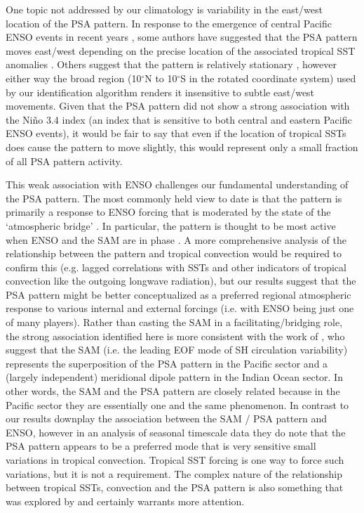 One topic not addressed by our climatology is variability in the east/west location of the PSA pattern. In response to the emergence of central Pacific ENSO events in recent years \citep[e.g.][]{Ashok2007}, some authors have suggested that the PSA pattern moves east/west depending on the precise location of the associated tropical SST anomalies \citep[e.g.][]{Sun2013,Wilson2014,Ciasto2015}. Others suggest that the pattern is relatively stationary \citep[e.g.][]{Liu2007,Ding2012}, however either way the broad region (10$^{\circ}$N to 10$^{\circ}$S in the rotated coordinate system) used by our identification algorithm renders it insensitive to subtle east/west movements. Given that the PSA pattern did not show a strong association with the Ni\~{n}o 3.4 index (an index that is sensitive to both central and eastern Pacific ENSO events), it would be fair to say that even if the location of tropical SSTs does cause the pattern to move slightly, this would represent only a small fraction of all PSA pattern activity. 

This weak association with ENSO challenges our fundamental understanding of the PSA pattern. The most commonly held view to date is that the pattern is primarily a response to ENSO forcing \citep[e.g.][]{Mo2001} that is moderated by the state of the `atmospheric bridge' \citep{Liu2007}. In particular, the pattern is thought to be most active when ENSO and the SAM are in phase \citep{Fogt2006}. A more comprehensive analysis of the relationship between the pattern and tropical convection would be required to confirm this (e.g. lagged correlations with SSTs and other indicators of tropical convection like the outgoing longwave radiation), but our results suggest that the PSA pattern might be better conceptualized as a preferred regional atmospheric response to various internal and external forcings (i.e. with ENSO being just one of many players). Rather than casting the SAM in a facilitating/bridging role, the strong association identified here is more consistent with the work of \citet{Ding2012}, who suggest that the SAM (i.e. the leading EOF mode of SH circulation variability) represents the superposition of the PSA pattern in the Pacific sector and a (largely independent) meridional dipole pattern in the Indian Ocean sector. In other words, the SAM and the PSA pattern are closely related because in the Pacific sector they are essentially one and the same phenomenon. In contrast to \citet{Ding2012} our results downplay the association between the SAM / PSA pattern and ENSO, however in an analysis of seasonal timescale data they do note that the PSA pattern appears to be a preferred mode that is very sensitive small variations in tropical convection. Tropical SST forcing is one way to force such variations, but it is not a requirement. The complex nature of the relationship between tropical SSTs, convection and the PSA pattern is also something that was explored by \citet{Harangozo2004} and certainly warrants more attention.  

